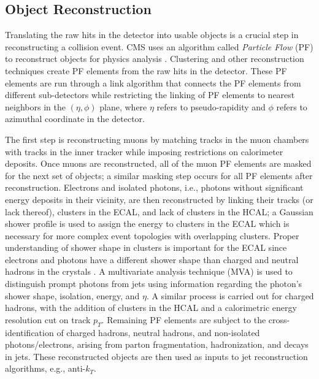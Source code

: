 \documentclass[12pt]{article}
\begin{document}

\subsection{Object Reconstruction}
Translating the raw hits in the detector into usable objects is a crucial step in reconstructing a collision event. CMS uses an algorithm called \textit{Particle Flow} (PF) to reconstruct objects for physics analysis \cite{particle_flow_2017}. Clustering and other reconstruction techniques create PF elements from the raw hits in the detector. These PF elements are run through a link algorithm that connects the PF elements from different sub-detectors while restricting the linking of PF elements to nearest neighbors in the $(\eta, \phi)$ plane, where $\eta$ refers to pseudo-rapidity and $\phi$ refers to azimuthal coordinate in the detector.\par

The first step is reconstructing muons by matching tracks in the muon chambers with tracks in the inner tracker while imposing restrictions on calorimeter deposits. Once muons are reconstructed, all of the muon PF elements are masked for the next set of objects; a similar masking step occurs for all PF elements after reconstruction. Electrons and isolated photons, i.e., photons without significant energy deposits in their vicinity, are then reconstructed by linking their tracks (or lack thereof), clusters in the ECAL, and lack of clusters in the HCAL; a Gaussian shower profile is used to assign the energy to clusters in the ECAL which is necessary for more complex event topologies with overlapping clusters. Proper understanding of shower shape in clusters is important for the ECAL since electrons and photons have a different shower shape than charged and neutral hadrons in the crystals \cite{egamma_reco_2021}. A multivariate analysis technique (MVA) is used to distinguish prompt photons from jets using information regarding the photon's shower shape, isolation, energy, and $\eta$.  A similar process is carried out for charged hadrons, with the addition of clusters in the HCAL and a calorimetric energy resolution cut on track $p_T$. Remaining PF elements are subject to the cross-identification of charged hadrons, neutral hadrons, and non-isolated photons/electrons, arising from parton fragmentation, hadronization, and decays in jets. These reconstructed objects are then used as inputs to jet reconstruction algorithms, e.g., anti-$k_T$.\par
\end{document}
